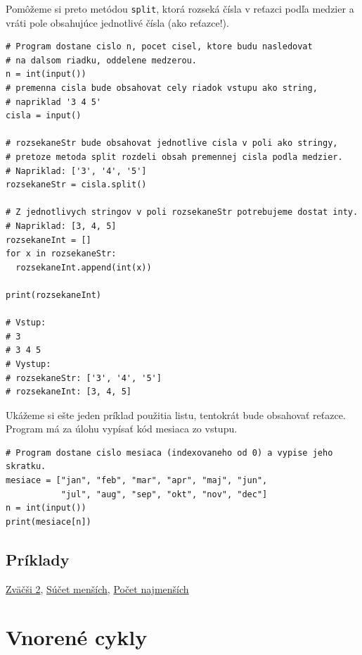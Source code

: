 Pomôžeme si preto metódou \texttt{split}, ktorá rozseká čísla v reťazci podľa medzier a vráti pole obsahujúce jednotlivé čísla (ako reťazce!).
\begin{lstlisting}
# Program dostane cislo n, pocet cisel, ktore budu nasledovat
# na dalsom riadku, oddelene medzerou.
n = int(input())
# premenna cisla bude obsahovat cely riadok vstupu ako string,
# napriklad '3 4 5'
cisla = input()

# rozsekaneStr bude obsahovat jednotlive cisla v poli ako stringy,
# pretoze metoda split rozdeli obsah premennej cisla podla medzier.
# Napriklad: ['3', '4', '5']
rozsekaneStr = cisla.split()

# Z jednotlivych stringov v poli rozsekaneStr potrebujeme dostat inty.
# Napriklad: [3, 4, 5]
rozsekaneInt = []
for x in rozsekaneStr:
  rozsekaneInt.append(int(x))

print(rozsekaneInt)

# Vstup:
# 3 
# 3 4 5
# Vystup:
# rozsekaneStr: ['3', '4', '5']
# rozsekaneInt: [3, 4, 5]
\end{lstlisting}

Ukážeme si ešte jeden príklad použitia listu, tentokrát bude obsahovať reťazce. Program má za úlohu vypísať kód mesiaca zo vstupu.
\begin{lstlisting}
# Program dostane cislo mesiaca (indexovaneho od 0) a vypise jeho skratku.
mesiace = ["jan", "feb", "mar", "apr", "maj", "jun",
           "jul", "aug", "sep", "okt", "nov", "dec"]
n = int(input())
print(mesiace[n])
\end{lstlisting}

\subsection{Príklady}
\href{https://testovac.ksp.sk/tasks/ls-uvod-zvacsi2/}{Zväčši 2},
\href{https://testovac.ksp.sk/tasks/ls-uvod-sucetmensich/}{Súčet menších},
\href{https://testovac.ksp.sk/tasks/ls-uvod-pocetnajmensich/}{Počet najmenších}

\section{Vnorené cykly}

